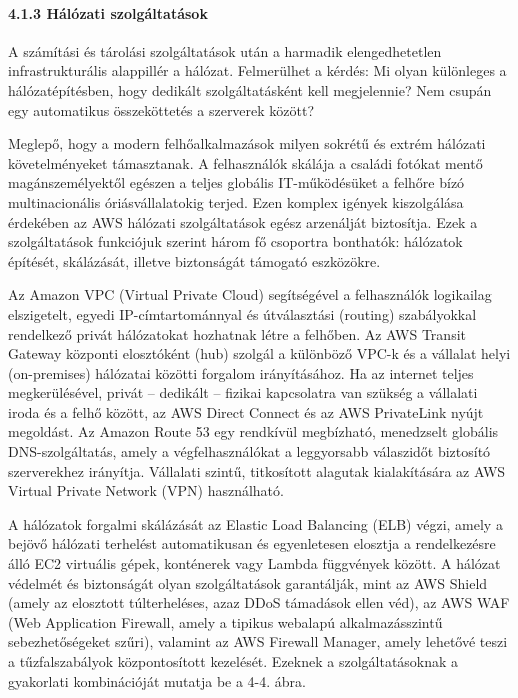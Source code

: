 \documentclass[
]{article}
\begin{document}
\hypertarget{huxe1luxf3zati-szolguxe1ltatuxe1sok}{%
\paragraph{4.1.3 Hálózati
szolgáltatások}\label{huxe1luxf3zati-szolguxe1ltatuxe1sok}}

A számítási és tárolási szolgáltatások után a harmadik elengedhetetlen
infrastrukturális alappillér a hálózat. Felmerülhet a kérdés: Mi olyan
különleges a hálózatépítésben, hogy dedikált szolgáltatásként kell
megjelennie? Nem csupán egy automatikus összeköttetés a szerverek
között?

Meglepő, hogy a modern felhőalkalmazások milyen sokrétű és extrém
hálózati követelményeket támasztanak. A felhasználók skálája a családi
fotókat mentő magánszemélyektől egészen a teljes globális IT-működésüket
a felhőre bízó multinacionális óriásvállalatokig terjed. Ezen komplex
igények kiszolgálása érdekében az AWS hálózati szolgáltatások egész
arzenálját biztosítja. Ezek a szolgáltatások funkciójuk szerint három fő
csoportra bonthatók: hálózatok építését, skálázását, illetve biztonságát
támogató eszközökre.

Az Amazon VPC (Virtual Private Cloud) segítségével a felhasználók
logikailag elszigetelt, egyedi IP-címtartománnyal és útválasztási
(routing) szabályokkal rendelkező privát hálózatokat hozhatnak létre a
felhőben. Az AWS Transit Gateway központi elosztóként (hub) szolgál a
különböző VPC-k és a vállalat helyi (on-premises) hálózatai közötti
forgalom irányításához. Ha az internet teljes megkerülésével, privát --
dedikált -- fizikai kapcsolatra van szükség a vállalati iroda és a felhő
között, az AWS Direct Connect és az AWS PrivateLink nyújt megoldást. Az
Amazon Route 53 egy rendkívül megbízható, menedzselt globális
DNS-szolgáltatás, amely a végfelhasználókat a leggyorsabb válaszidőt
biztosító szerverekhez irányítja. Vállalati szintű, titkosított alagutak
kialakítására az AWS Virtual Private Network (VPN) használható.

A hálózatok forgalmi skálázását az Elastic Load Balancing (ELB) végzi,
amely a bejövő hálózati terhelést automatikusan és egyenletesen elosztja
a rendelkezésre álló EC2 virtuális gépek, konténerek vagy Lambda
függvények között. A hálózat védelmét és biztonságát olyan
szolgáltatások garantálják, mint az AWS Shield (amely az elosztott
túlterheléses, azaz DDoS támadások ellen véd), az AWS WAF (Web
Application Firewall, amely a tipikus webalapú alkalmazásszintű
sebezhetőségeket szűri), valamint az AWS Firewall Manager, amely
lehetővé teszi a tűzfalszabályok központosított kezelését. Ezeknek a
szolgáltatásoknak a gyakorlati kombinációját mutatja be a 4-4. ábra.
\end{document}
